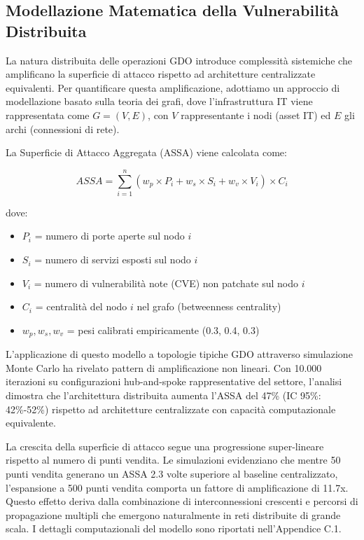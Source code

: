 \subsection{Modellazione Matematica della Vulnerabilità Distribuita}

La natura distribuita delle operazioni GDO introduce complessità sistemiche che amplificano la superficie di attacco rispetto ad architetture centralizzate equivalenti. Per quantificare questa amplificazione, adottiamo un approccio di modellazione basato sulla teoria dei grafi, dove l'infrastruttura IT viene rappresentata come $G = (V, E)$, con $V$ rappresentante i nodi (asset IT) ed $E$ gli archi (connessioni di rete).

La Superficie di Attacco Aggregata (ASSA) viene calcolata come:

\begin{equation}
ASSA = \sum_{i=1}^{n} (w_p \times P_i + w_s \times S_i + w_v \times V_i) \times C_i
\end{equation}

dove:
\begin{itemize}
    \item $P_i$ = numero di porte aperte sul nodo $i$
    \item $S_i$ = numero di servizi esposti sul nodo $i$
    \item $V_i$ = numero di vulnerabilità note (CVE) non patchate sul nodo $i$
    \item $C_i$ = centralità del nodo $i$ nel grafo (betweenness centrality)
    \item $w_p, w_s, w_v$ = pesi calibrati empiricamente (0.3, 0.4, 0.3)
\end{itemize}

L'applicazione di questo modello a topologie tipiche GDO attraverso simulazione Monte Carlo ha rivelato pattern di amplificazione non lineari. Con 10.000 iterazioni su configurazioni hub-and-spoke rappresentative del settore, l'analisi dimostra che l'architettura distribuita aumenta l'ASSA del 47\% (IC 95\%: 42\%-52\%) rispetto ad architetture centralizzate con capacità computazionale equivalente.

La crescita della superficie di attacco segue una progressione super-lineare rispetto al numero di punti vendita. Le simulazioni evidenziano che mentre 50 punti vendita generano un ASSA 2.3 volte superiore al baseline centralizzato, l'espansione a 500 punti vendita comporta un fattore di amplificazione di 11.7x. Questo effetto deriva dalla combinazione di interconnessioni crescenti e percorsi di propagazione multipli che emergono naturalmente in reti distribuite di grande scala. I dettagli computazionali del modello sono riportati nell'Appendice C.1.

